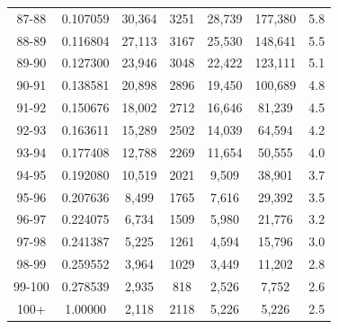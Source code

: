 \documentclass[12pt,a4paper]{article}
\begin{document}
\begin{longtable}{|c|c|c|c|c|c|c|}
87-88  & 0.107059      & 30,364       & 3251          & 28,739        & 177,380      & 5.8          \\
88-89  & 0.116804      & 27,113       & 3167          & 25,530        & 148,641      & 5.5          \\
89-90  & 0.127300      & 23,946       & 3048          & 22,422        & 123,111      & 5.1          \\
90-91  & 0.138581      & 20,898       & 2896          & 19,450        & 100,689      & 4.8          \\
91-92  & 0.150676      & 18,002       & 2712          & 16,646        & 81,239       & 4.5          \\
92-93  & 0.163611      & 15,289       & 2502          & 14,039        & 64,594       & 4.2          \\
93-94  & 0.177408      & 12,788       & 2269          & 11,654        & 50,555       & 4.0          \\
94-95  & 0.192080      & 10,519       & 2021          & 9,509         & 38,901       & 3.7          \\
95-96  & 0.207636      & 8,499        & 1765          & 7,616         & 29,392       & 3.5          \\
96-97  & 0.224075      & 6,734        & 1509          & 5,980         & 21,776       & 3.2          \\
97-98  & 0.241387      & 5,225        & 1261          & 4,594         & 15,796       & 3.0          \\
98-99  & 0.259552      & 3,964        & 1029          & 3,449         & 11,202       & 2.8          \\
99-100 & 0.278539      & 2,935        & 818           & 2,526         & 7,752        & 2.6          \\
100+   & 1.00000       & 2,118        & 2118          & 5,226         & 5,226        & 2.5          \\
\hline
\end{longtable}

\addappheadtotoc
\end{document}
